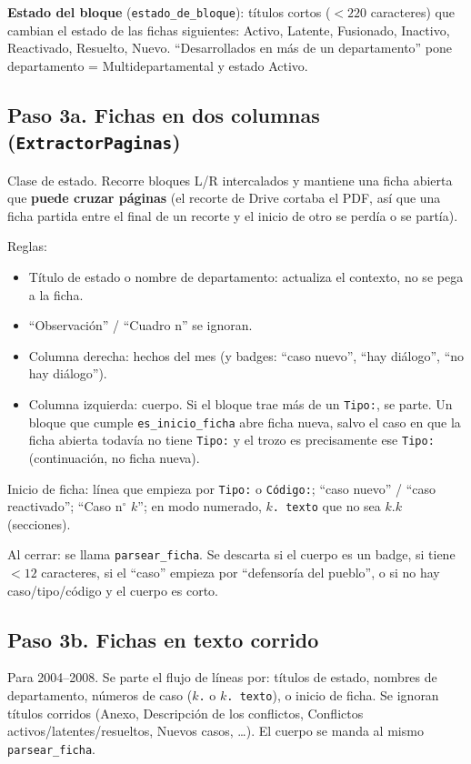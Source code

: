 \documentclass[11pt,a4paper]{article}
\begin{document}
\textbf{Estado del bloque} (\texttt{estado\_de\_bloque}): títulos cortos ($<220$ caracteres) que cambian el estado de las fichas siguientes: Activo, Latente, Fusionado, Inactivo, Reactivado, Resuelto, Nuevo. ``Desarrollados en más de un departamento'' pone departamento = Multidepartamental y estado Activo.

\subsection{Paso 3a. Fichas en dos columnas (\texttt{ExtractorPaginas})}

Clase de estado. Recorre bloques L/R intercalados y mantiene una ficha abierta que \textbf{puede cruzar páginas} (el recorte de Drive cortaba el PDF, así que una ficha partida entre el final de un recorte y el inicio de otro se perdía o se partía).

Reglas:

\begin{itemize}
  \item Título de estado o nombre de departamento: actualiza el contexto, no se pega a la ficha.
  \item ``Observación'' / ``Cuadro n'' se ignoran.
  \item Columna derecha: hechos del mes (y badges: ``caso nuevo'', ``hay diálogo'', ``no hay diálogo'').
  \item Columna izquierda: cuerpo. Si el bloque trae más de un \texttt{Tipo:}, se parte. Un bloque que cumple \texttt{es\_inicio\_ficha} abre ficha nueva, salvo el caso en que la ficha abierta todavía no tiene \texttt{Tipo:} y el trozo es precisamente ese \texttt{Tipo:} (continuación, no ficha nueva).
\end{itemize}

Inicio de ficha: línea que empieza por \texttt{Tipo:} o \texttt{Código:}; ``caso nuevo'' / ``caso reactivado''; ``Caso n$^\circ$ $k$''; en modo numerado, \texttt{$k$. texto} que no sea \texttt{$k.k$} (secciones).

Al cerrar: se llama \texttt{parsear\_ficha}. Se descarta si el cuerpo es un badge, si tiene $<12$ caracteres, si el ``caso'' empieza por ``defensoría del pueblo'', o si no hay caso/tipo/código y el cuerpo es corto.

\subsection{Paso 3b. Fichas en texto corrido}

Para 2004--2008. Se parte el flujo de líneas por: títulos de estado, nombres de departamento, números de caso (\texttt{$k$.} o \texttt{$k$. texto}), o inicio de ficha. Se ignoran títulos corridos (Anexo, Descripción de los conflictos, Conflictos activos/latentes/resueltos, Nuevos casos, \ldots). El cuerpo se manda al mismo \texttt{parsear\_ficha}.
\end{document}
